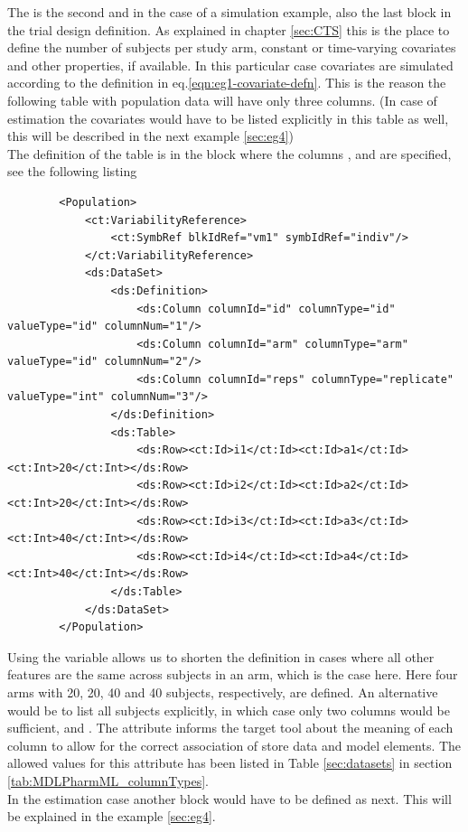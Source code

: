 The  is the second and in the case of a simulation example,
also the last block in the trial design definition. As explained in chapter \ref{sec:CTS}
this is the place to define the number of subjects per study arm, constant
or time-varying covariates and other properties, if available.
In this particular case covariates are simulated according to the definition in 
eq.\ref{eqn:eg1-covariate-defn}. This is the reason the following table with 
population data will have only three columns. (In case of estimation the covariates would have to 
be listed explicitly in this table as well, this will be described in the next example \ref{sec:eg4})\\
The definition of the table is in the  block where the columns
,  and  are specified, see the following listing 
\lstset{language=XML}
\begin{lstlisting}
        <Population>
            <ct:VariabilityReference>
                <ct:SymbRef blkIdRef="vm1" symbIdRef="indiv"/>
            </ct:VariabilityReference>
            <ds:DataSet>
                <ds:Definition>
                    <ds:Column columnId="id" columnType="id" valueType="id" columnNum="1"/>
                    <ds:Column columnId="arm" columnType="arm" valueType="id" columnNum="2"/>
                    <ds:Column columnId="reps" columnType="replicate" valueType="int" columnNum="3"/>
                </ds:Definition>
                <ds:Table>
                    <ds:Row><ct:Id>i1</ct:Id><ct:Id>a1</ct:Id><ct:Int>20</ct:Int></ds:Row>
                    <ds:Row><ct:Id>i2</ct:Id><ct:Id>a2</ct:Id><ct:Int>20</ct:Int></ds:Row>
                    <ds:Row><ct:Id>i3</ct:Id><ct:Id>a3</ct:Id><ct:Int>40</ct:Int></ds:Row>
                    <ds:Row><ct:Id>i4</ct:Id><ct:Id>a4</ct:Id><ct:Int>40</ct:Int></ds:Row>
                </ds:Table>
            </ds:DataSet>
        </Population>
\end{lstlisting}

Using the  variable allows us
to shorten the definition in cases where all other features are the same across subjects in
an arm, which is the case here. Here four arms with 20, 20, 40 and 40 subjects, respectively, are defined.
An alternative would be to list all subjects explicitly, in which case only two columns would be
sufficient,  and . The attribute  informs the target tool about
the meaning of each column to allow for the correct association of store data and model elements.
The allowed values for this attribute has been listed in Table \ref{sec:datasets} in 
section \ref{tab:MDLPharmML_columnTypes}.\\
In the estimation case another block  would have to be defined as next.
This will be explained in the example \ref{sec:eg4}.


